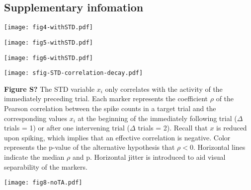 \documentclass[pdflatex,referee,iicol,sn-basic]{sn-jnl}
\theoremstyle{thmstyleone}%
\theoremstyle{thmstyletwo}%
\theoremstyle{thmstylethree}%
\begin{document}
\begin{appendices}

\section{Supplementary infomation}\label{secA1}

\begin{figure*}%
    \centering
    \texttt{[image: fig4-withSTD.pdf]}
    \caption{}
    \label{sfig4}
\end{figure*}

\begin{figure*}%
    \centering
    \texttt{[image: fig5-withSTD.pdf]}
    \caption{}
    \label{sfig5}
\end{figure*}

\begin{figure*}%
    \centering
    \texttt{[image: fig6-withSTD.pdf]}
    \caption{}
    \label{sfig6}
\end{figure*}

\begin{figure*}%
    \centering
    \texttt{[image: sfig-STD-correlation-decay.pdf]}
    \caption{}
    \label{sfig-STD-correlation-decay}
\end{figure*}
\textbf{Figure S?} The STD variable $x_i$ only correlates with the activity of the immediately preceding trial. Each marker represents the coefficient $\rho$ of the Pearson correlation between the spike counts in a target trial and the corresponding values $x_i$ at the beginning of the immediately following trial ($\Delta$ trials = 1) or after one intervening trial ($\Delta$ trials = 2). Recall that $x$ is reduced upon spiking, which implies that an effective correlation is negative. Color represents the p-value of the alternative hypothesis that $\rho < 0$. Horizontal lines indicate the median $\rho$ and p. Horizontal jitter is introduced to aid visual separability of the markers.

\begin{figure*}%
    \centering
    \texttt{[image: fig8-noTA.pdf]}
    \caption{}
    \label{sfig8}
\end{figure*}




\end{appendices}
\end{document}
